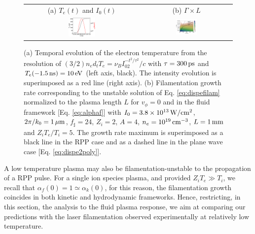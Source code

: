 \documentclass[
 reprint,
 superscriptaddress,
 amsmath,amssymb,
 aps,
]{revtex4-1}
\def\tc{\textcolor{red}}
\begin{document}
\begin{figure}
\begin{tabular}{cc}
(a) $T_e(t)$ and $I_0(t)$&
(b) $\Gamma \times L$  \\
\includegraphics[width=0.24\textwidth]{xpFuchs_te.eps}& 
\includegraphics[width=0.24\textwidth]{xpFuchs.png}
\end{tabular}
\caption{ \label{fig:xpfuchs_th}  
(a) Temporal evolution of the electron temperature 
from the resolution of $(3/2)n_e d_tT_e=\nu_BI_02^{-t^2/\tau^2}/c$ with $\tau = 300\,\rm ps$  and $T_e(-1.5 \, \rm{ns})=10\,\rm eV$ (left axis, black).
The intensity evolution is superimposed as a red line (right axis).
(b) Filamentation growth rate corresponding to the unstable solution  of Eq. \eqref{eq:dispefilam} normalized to the plasma length  $L$  for $v_\phi=0$ and in the fluid framework [Eq. \eqref{eq:alphaf}] with $I_0=3.8\times 10^{13}\, \rm W/cm^2$, $2\pi/k_0=1\,\rm\mu m$, $f_\sharp=24$, $Z_i=2$, $A=4$, $n_e=10^{19} \,\rm cm^{-3}$,  $L=1\,\rm mm$ and  $Z_iT_e/T_i=5$. 
The growth rate maximum is superimposed as a  black line in the RPP case and as a dashed line in the plane wave case [Eq. \eqref{eq:dispe2poly}].
 }
\end{figure}

A low temperature plasma may also be filamentation-unstable to the  propagation of a RPP pulse.
For a single ion species plasma, and provided $Z_iT_e\gg T_i$,   we recall that $\alpha_f(0)=1\simeq \alpha_k(0)$, for this reason, the filamentation growth coincides in both  kinetic and hydrodynamic frameworks. 
Hence, restricting, in this section, the analysis to the fluid plasma response, we aim at comparing our predictions with the laser filamentation observed experimentally at relatively low temperature.
\end{document}
